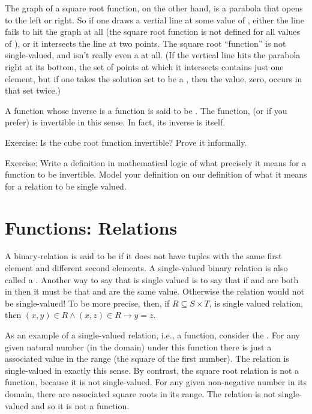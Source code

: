 \documentclass[letterpaper,10pt,english]{sphinxmanual}
\begin{document}
The graph of a square root function, on the other hand, is a parabola
that opens to the left or right. So if one draws a vertial line at
some value of , either the line fails to hit the graph at all (the
square root function is not defined for all values of ), or it
intersects the line at two points. The square root “function” is not
single-valued, and isn’t really even a  at all. (If the
vertical line hits the parabola right at its bottom, the set of points
at which it intersects contains just one element, but if one takes the
solution set to be a , then the value, zero, occurs in that
set twice.)

A function whose inverse is a function is said to be .
The function,  (or  if you prefer) is invertible in
this sense. In fact, its inverse is itself.

Exercise: Is the cube root function invertible? Prove it informally.

Exercise: Write a definition in mathematical logic of what precisely
it means for a function to be invertible. Model your definition on our
definition of what it means for a relation to be single valued.


\section{Functions:  Relations}
\label{\detokenize{08-relations:functions-single-valued-relations}}
A binary-relation is said to be  if it does not have
tuples with the same first element and different second elements.  A
single-valued binary relation is also called a .  Another
way to say that  is single valued is to say that if  and
 are both in  then it must be that  and  are the same
value. Otherwise the relation would not be single-valued! To be more
precise, then, if \(R \subseteq S \times T\), is single valued
relation, then \((x, y) \in R \land (x, z) \in R \rightarrow y =
z\).

As an example of a single-valued relation, i.e., a function, consider
the . For any given natural number (in the domain) under this
function there is just a  associated value in the range (the
square of the first number). The relation is single-valued in exactly
this sense. By contrast, the square root relation is not a function,
because it is not single-valued. For any given non-negative number in
its domain, there are  associated square roots in its range. The
relation is not single-valued and so it is not a function.
\end{document}
